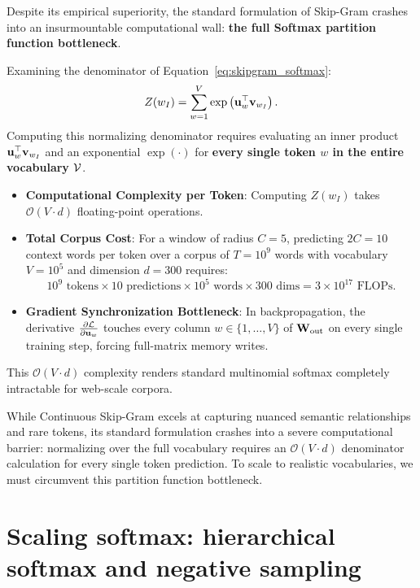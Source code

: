 \documentclass[../../main.tex]{subfiles}
\begin{document}
Despite its empirical superiority, the standard formulation of Skip-Gram crashes into an insurmountable computational wall: \textbf{the full Softmax partition function bottleneck}.

Examining the denominator of Equation~\eqref{eq:skipgram_softmax}:
\begin{equation}
\label{eq:partition_function}
Z(w_I) = \sum_{w=1}^V \exp\left( \mathbf{u}_w^\top \mathbf{v}_{w_I} \right).
\end{equation}
Computing this normalizing denominator requires evaluating an inner product $\mathbf{u}_w^\top \mathbf{v}_{w_I}$ and an exponential $\exp(\cdot)$ for \textbf{every single token $w$ in the entire vocabulary $\mathcal{V}$}.
\begin{itemize}
    \item \textbf{Computational Complexity per Token}: Computing $Z(w_I)$ takes $\mathcal{O}(V \cdot d)$ floating-point operations.
    \item \textbf{Total Corpus Cost}: For a window of radius $C = 5$, predicting $2C = 10$ context words per token over a corpus of $T = 10^9$ words with vocabulary $V = 10^5$ and dimension $d = 300$ requires:
    \begin{equation}
    \label{eq:flops_wall}
    10^9 \text{ tokens} \times 10 \text{ predictions} \times 10^5 \text{ words} \times 300 \text{ dims} = 3 \times 10^{17} \text{ FLOPs}.
    \end{equation}
    \item \textbf{Gradient Synchronization Bottleneck}: In backpropagation, the derivative $\frac{\partial \mathcal{L}}{\partial \mathbf{u}_w}$ touches every column $w \in \{1, \dots, V\}$ of $\mathbf{W}_{\text{out}}$ on every single training step, forcing full-matrix memory writes.
\end{itemize}
This $\mathcal{O}(V \cdot d)$ complexity renders standard multinomial softmax completely intractable for web-scale corpora.

While Continuous Skip-Gram excels at capturing nuanced semantic relationships and rare tokens, its standard formulation crashes into a severe computational barrier: normalizing over the full vocabulary requires an $\mathcal{O}(V \cdot d)$ denominator calculation for every single token prediction. To scale to realistic vocabularies, we must circumvent this partition function bottleneck.

\clearpage
\section{Scaling softmax: hierarchical softmax and negative sampling}
\label{sec:scaling_softmax}
\end{document}

